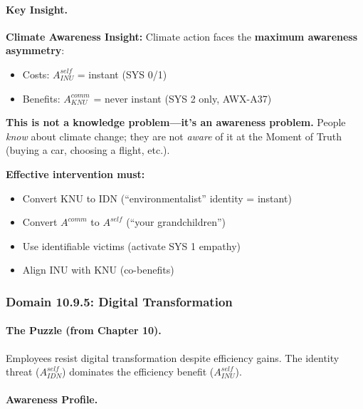 \paragraph{Key Insight.}
\begin{tcolorbox}[colback=yellow!10!white, colframe=yellow!50!black]
\textbf{Climate Awareness Insight:}
Climate action faces the \textbf{maximum awareness asymmetry}:
\begin{itemize}
\item Costs: $A^{self}_{INU}$ = instant (SYS 0/1)
\item Benefits: $A^{comm}_{KNU}$ = never instant (SYS 2 only, AWX-A37)
\end{itemize}

\textbf{This is not a knowledge problem---it's an awareness problem.}
People \emph{know} about climate change; they are not \emph{aware} of it 
at the Moment of Truth (buying a car, choosing a flight, etc.).

\textbf{Effective intervention must:}
\begin{itemize}
\item Convert KNU to IDN (``environmentalist'' identity = instant)
\item Convert $A^{comm}$ to $A^{self}$ (``your grandchildren'')
\item Use identifiable victims (activate SYS 1 empathy)
\item Align INU with KNU (co-benefits)
\end{itemize}
\end{tcolorbox}

\subsubsection{Domain 10.9.5: Digital Transformation}
\label{subsubsec:awareness-digital}

\paragraph{The Puzzle (from Chapter 10).}
Employees resist digital transformation despite efficiency gains.
The identity threat ($A^{self}_{IDN}$) dominates the efficiency benefit ($A^{self}_{INU}$).

\paragraph{Awareness Profile.}

